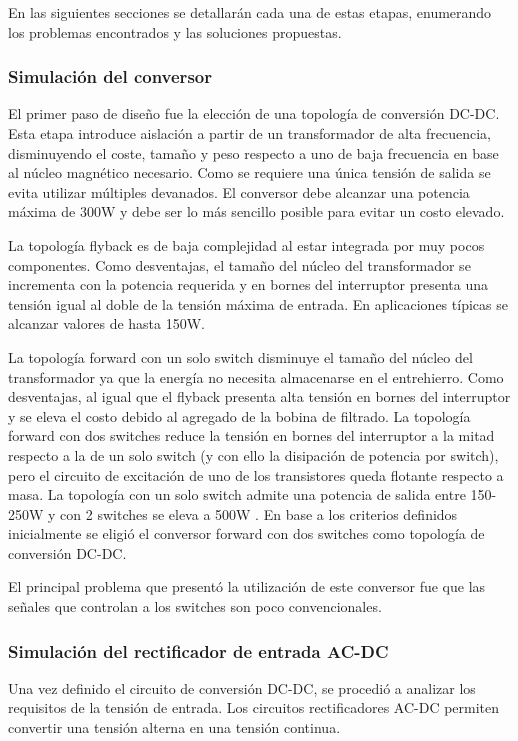 En las siguientes secciones se detallarán cada una de estas etapas,
enumerando los problemas encontrados y las soluciones propuestas.

\subsubsection{Simulación del conversor}
El primer paso de diseño fue la elección de una topología de conversión DC-DC.
Esta etapa introduce aislación a partir de un transformador de alta frecuencia,
disminuyendo el coste, tamaño y peso respecto a uno de baja frecuencia en base al núcleo magnético necesario.
Como se requiere una única tensión de salida se evita utilizar múltiples devanados.
El conversor debe alcanzar una potencia máxima de 300W y debe ser lo más sencillo posible para evitar un costo elevado. 

La topología flyback es de baja complejidad al estar integrada por muy pocos componentes. 
Como desventajas, el tamaño del núcleo del transformador se incrementa con la potencia requerida y en bornes del
interruptor presenta una tensión igual al doble de la tensión máxima de entrada.
En aplicaciones típicas se alcanzar valores de hasta 150W.

La topología forward con un solo switch disminuye el tamaño del núcleo del transformador ya que la energía no necesita almacenarse en el entrehierro.
Como desventajas, al igual que el flyback presenta alta tensión en bornes del interruptor y se eleva el costo debido al agregado de la bobina de filtrado.
La topología forward con dos switches reduce la tensión en bornes del interruptor a la mitad respecto a la de un solo switch (y con ello la disipación de potencia por switch), 
pero el circuito de excitación de uno de los transistores queda flotante respecto a masa. 
La topología con un solo switch admite una potencia de salida entre 150-250W y con 2 switches se eleva a 500W \cite{mohan}\cite{hart}. 
En base a los criterios definidos inicialmente se eligió el conversor forward con dos switches como topología de conversión DC-DC. 

El principal problema que presentó la utilización de este conversor fue que las señales que controlan a los switches son poco convencionales.

\subsubsection{Simulación del rectificador de entrada AC-DC}
Una vez definido el circuito de conversión DC-DC, se procedió a analizar los requisitos de la tensión de entrada. 
Los circuitos rectificadores AC-DC permiten convertir una tensión alterna en una tensión continua.

